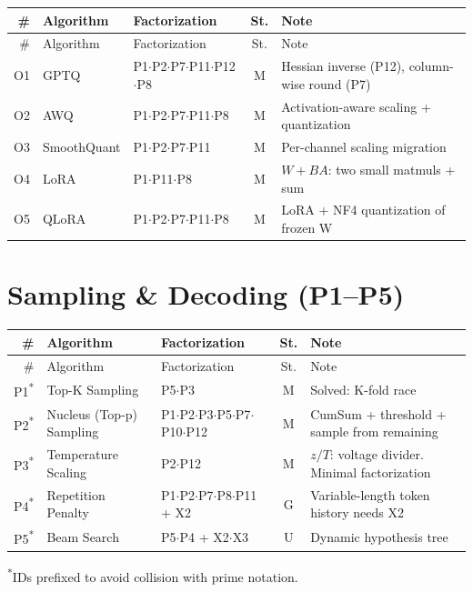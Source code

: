\documentclass[10pt]{article}
\begin{document}
\begin{longtable}{rlp{3.0cm}cp{4.8cm}}
\toprule
\# & Algorithm & Factorization & St. & Note \\
\midrule
\endfirsthead
\toprule
\# & Algorithm & Factorization & St. & Note \\
\midrule
\endhead
\bottomrule
\endfoot
O1 & GPTQ & P1$\cdot$P2$\cdot$P7$\cdot$P11$\cdot$P12$\cdot$P8 & M & Hessian inverse (P12), column-wise round (P7) \\
O2 & AWQ & P1$\cdot$P2$\cdot$P7$\cdot$P11$\cdot$P8 & M & Activation-aware scaling + quantization \\
O3 & SmoothQuant & P1$\cdot$P2$\cdot$P7$\cdot$P11 & M & Per-channel scaling migration \\
O4 & LoRA & P1$\cdot$P11$\cdot$P8 & M & $W + BA$: two small matmuls + sum \\
O5 & QLoRA & P1$\cdot$P2$\cdot$P7$\cdot$P11$\cdot$P8 & M & LoRA + NF4 quantization of frozen W \\
\end{longtable}

\section{Sampling \& Decoding (P1--P5)}

\begin{longtable}{rlp{3.0cm}cp{4.8cm}}
\toprule
\# & Algorithm & Factorization & St. & Note \\
\midrule
\endfirsthead
\toprule
\# & Algorithm & Factorization & St. & Note \\
\midrule
\endhead
\bottomrule
\endfoot
P1\textsuperscript{*} & Top-K Sampling & P5$\cdot$P3 & M & Solved: K-fold race \\
P2\textsuperscript{*} & Nucleus (Top-p) Sampling & P1$\cdot$P2$\cdot$P3$\cdot$P5$\cdot$P7$\cdot$P10$\cdot$P12 & M & CumSum + threshold + sample from remaining \\
P3\textsuperscript{*} & Temperature Scaling & P2$\cdot$P12 & M & $z/T$: voltage divider. Minimal factorization \\
P4\textsuperscript{*} & Repetition Penalty & P1$\cdot$P2$\cdot$P7$\cdot$P8$\cdot$P11 + X2 & G & Variable-length token history needs X2 \\
P5\textsuperscript{*} & Beam Search & P5$\cdot$P4 + X2$\cdot$X3 & U & Dynamic hypothesis tree \\
\end{longtable}
{\small\textsuperscript{*}IDs prefixed to avoid collision with prime notation.}
\end{document}
